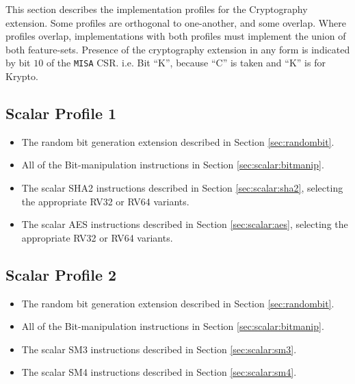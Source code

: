 

This section describes the implementation profiles for the
Cryptography extension.
Some profiles are orthogonal to one-another, and some overlap.
Where profiles overlap, implementations with both profiles must
implement the union of both feature-sets.
Presence of the cryptography extension in any form is indicated
by bit $10$ of the {\tt MISA} CSR.
i.e. Bit ``K'', because ``C'' is taken and ``K'' is for Krypto.


\subsection{Scalar Profile 1}

\begin{itemize}
\item The random bit generation extension described in Section
      \ref{sec:randombit}.
\item All of the Bit-manipulation instructions in
      Section \ref{sec:scalar:bitmanip}.
\item The scalar SHA2 instructions described in Section
      \ref{sec:scalar:sha2},
      selecting the appropriate RV32 or RV64 variants.
\item The scalar AES instructions described in Section
      \ref{sec:scalar:aes},
      selecting the appropriate RV32 or RV64 variants.
\end{itemize}

\subsection{Scalar Profile 2}

\begin{itemize}
\item The random bit generation extension described in Section
      \ref{sec:randombit}.
\item All of the Bit-manipulation instructions in
      Section \ref{sec:scalar:bitmanip}.
\item The scalar SM3 instructions described in Section \ref{sec:scalar:sm3}.
\item The scalar SM4 instructions described in Section \ref{sec:scalar:sm4}.
\end{itemize}


